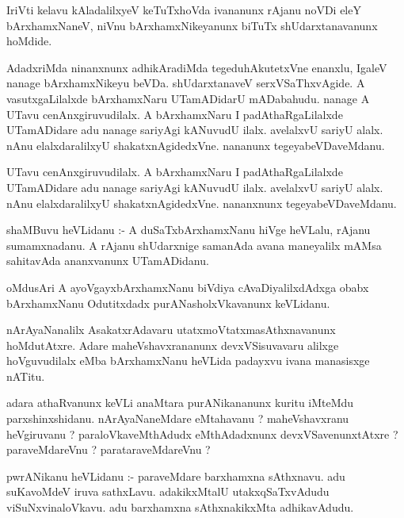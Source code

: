 \documentclass{article}
\begin{document}
\begin{mn}
IriVti  kelavu  kAladalilxyeV  keTuTxhoVda  ivananunx  rAjanu  noVDi  eleY  bArxhamxNaneV,  niVnu  
bArxhamxNikeyanunx  biTuTx  shUdarxtanavanunx  hoMdide.
\end{mn}

\begin{mn}
AdadxriMda  ninanxnunx  adhikAradiMda  tegeduhAkutetxVne  enanxlu,  IgaleV  nanage  bArxhamxNikeyu  beVDa.  
shUdarxtanaveV  serxVSaThxvAgide.  A  vasutxgaLilalxde  bArxhamxNaru  UTamADidarU  mADabahudu.  nanage  A  
UTavu  cenAnxgiruvudilalx.  A  bArxhamxNaru  I  padAthaRgaLilalxde  UTamADidare  adu  nanage  sariyAgi  kANuvudU  
ilalx.  avelalxvU  sariyU  alalx.  nAnu  elalxdaralilxyU  shakatxnAgidedxVne.  nananunx  tegeyabeVDaveMdanu.
\end{mn}

\begin{mn}
UTavu  cenAnxgiruvudilalx.  A  bArxhamxNaru  I  padAthaRgaLilalxde  UTamADidare  adu  nanage  sariyAgi  kANuvudU  
ilalx.  avelalxvU  sariyU alalx.  nAnu  elalxdaralilxyU  shakatxnAgidedxVne.  nananxnunx  tegeyabeVDaveMdanu.
\end{mn}

\begin{mn}
shaMBuvu  heVLidanu :- A  duSaTxbArxhamxNanu  hiVge  heVLalu,  rAjanu  sumamxnadanu.  A  rAjanu  shUdarxnige  
samanAda  avana  maneyalilx  mAMsa  sahitavAda  ananxvanunx  UTamADidanu.
\end{mn}

\begin{mn}
oMdusAri  A  ayoVgayxbArxhamxNanu  biVdiya  cAvaDiyalilxdAdxga  obabx  bArxhamxNanu  Odutitxdadx  purANasholxVkavanunx  keVLidanu.
\end{mn}

\begin{mn}
nArAyaNanalilx  AsakatxrAdavaru  utatxmoVtatxmasAthxnavanunx  hoMdutAtxre.  Adare  maheVshavxrananunx  
devxVSisuvavaru  alilxge  hoVguvudilalx  eMba  bArxhamxNanu  heVLida  padayxvu  ivana  manasisxge  nATitu.
\end{mn}

\begin{mn}
adara  athaRvanunx  keVLi  anaMtara  purANikananunx  kuritu  iMteMdu  parxshinxshidanu.  nArAyaNaneMdare  eMtahavanu ?  
maheVshavxranu  heVgiruvanu ?  paraloVkaveMthAdudx  eMthAdadxnunx  devxVSavenunxtAtxre ?  paraveMdareVnu ?  parataraveMdareVnu ?
\end{mn}

\begin{mn}
pwrANikanu  heVLidanu :- paraveMdare  barxhamxna  sAthxnavu.  adu  suKavoMdeV  iruva  sathxLavu.  adakikxMtalU  
utakxqSaTxvAdudu  viSuNxvinaloVkavu.  adu  barxhamxna  sAthxnakikxMta  adhikavAdudu.
\end{mn}
\end{document}
